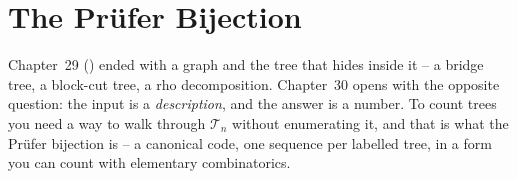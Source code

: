 \section{The Pr\"ufer Bijection}\label{sec:c32-prufer}

\begin{previouslybox}
Chapter~29 () ended with a graph and the tree that hides inside
it -- a bridge tree, a block-cut tree, a rho decomposition.  Chapter~30 opens
with the opposite question: the input is a \emph{description}, and the answer
is a number.  To count trees you need a way to walk through \(\mathcal{T}_n\)
without enumerating it, and that is what the Pr\"ufer bijection is -- a
canonical code, one sequence per labelled tree, in a form you can count with
elementary combinatorics.
\end{previouslybox}

